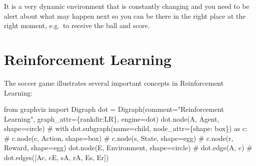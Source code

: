 \documentclass[
  letterpaper,
]{scrbook}
\newenvironment{Shaded}{\begin{snugshade}}{\end{snugshade}}
\newcommand{\CommentTok}[1]{\textcolor[rgb]{0.37,0.37,0.37}{#1}}
\newcommand{\ImportTok}[1]{\textcolor[rgb]{0.00,0.46,0.62}{#1}}
\newcommand{\NormalTok}[1]{\textcolor[rgb]{0.00,0.23,0.31}{#1}}
\newcommand{\OperatorTok}[1]{\textcolor[rgb]{0.37,0.37,0.37}{#1}}
\newcommand{\StringTok}[1]{\textcolor[rgb]{0.13,0.47,0.30}{#1}}
\begin{document}
It is a very dynamic environment that is constantly changing and you
need to be alert about what may happen next so you can be there in the
right place at the right moment, e.g.~to receive the ball and score.

\section*{Reinforcement Learning}\label{reinforcement-learning}


The soccer game illustrates several important concepts in Reinforcement
Learning:

\begin{Shaded}
\begin{Highlighting}[]
\ImportTok{from}\NormalTok{ graphviz }\ImportTok{import}\NormalTok{ Digraph}
\NormalTok{dot }\OperatorTok{=}\NormalTok{ Digraph(comment}\OperatorTok{=}\StringTok{"Reinforcement Learning"}\NormalTok{, graph\_attr}\OperatorTok{=}\NormalTok{\{}\StringTok{\textquotesingle{}rankdir\textquotesingle{}}\NormalTok{:}\StringTok{\textquotesingle{}LR\textquotesingle{}}\NormalTok{\}, engine}\OperatorTok{=}\StringTok{\textquotesingle{}dot\textquotesingle{}}\NormalTok{)}
\NormalTok{dot.node(}\StringTok{\textquotesingle{}A\textquotesingle{}}\NormalTok{, }\StringTok{\textquotesingle{}Agent\textquotesingle{}}\NormalTok{, shape}\OperatorTok{=}\StringTok{\textquotesingle{}circle\textquotesingle{}}\NormalTok{)}
\CommentTok{\# with dot.subgraph(name=\textquotesingle{}child\textquotesingle{}, node\_attr=\{\textquotesingle{}shape\textquotesingle{}: \textquotesingle{}box\textquotesingle{}\}) as c:}
\CommentTok{\#     c.node(\textquotesingle{}c\textquotesingle{}, \textquotesingle{}Action\textquotesingle{}, shape=\textquotesingle{}box\textquotesingle{})}
\CommentTok{\#     c.node(\textquotesingle{}s\textquotesingle{}, \textquotesingle{}State\textquotesingle{}, shape=\textquotesingle{}egg\textquotesingle{})}
\CommentTok{\#     c.node(\textquotesingle{}r\textquotesingle{}, \textquotesingle{}Reward\textquotesingle{}, shape=\textquotesingle{}egg\textquotesingle{})}
\NormalTok{dot.node(}\StringTok{\textquotesingle{}E\textquotesingle{}}\NormalTok{, }\StringTok{\textquotesingle{}Environment\textquotesingle{}}\NormalTok{, shape}\OperatorTok{=}\StringTok{\textquotesingle{}circle\textquotesingle{}}\NormalTok{)}
\CommentTok{\# dot.edge(\textquotesingle{}A\textquotesingle{}, \textquotesingle{}c\textquotesingle{})}
\CommentTok{\# dot.edges([\textquotesingle{}Ac\textquotesingle{}, \textquotesingle{}cE\textquotesingle{}, \textquotesingle{}sA\textquotesingle{}, \textquotesingle{}rA\textquotesingle{}, \textquotesingle{}Es\textquotesingle{}, \textquotesingle{}Er\textquotesingle{}])}

\end{Highlighting}
\end{Shaded}
\end{document}
